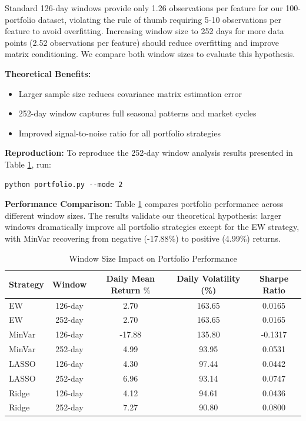 \documentclass[12pt]{article}
\begin{document}
Standard 126-day windows provide only 1.26 observations per feature for our 100-portfolio dataset, violating the rule of thumb requiring 5-10 observations per feature to avoid overfitting. Increasing window size to 252 days for more data points (2.52 observations per feature) should reduce overfitting and improve matrix conditioning. We compare both window sizes to evaluate this hypothesis.

\textbf{Theoretical Benefits:}
\begin{itemize}
    \item Larger sample size reduces covariance matrix estimation error
    \item 252-day window captures full seasonal patterns and market cycles
    \item Improved signal-to-noise ratio for all portfolio strategies
\end{itemize}

\textbf{Reproduction:}
To reproduce the 252-day window analysis results presented in Table \ref{tab:window_comparison}, run:
\begin{lstlisting}
python portfolio.py --mode 2
\end{lstlisting}

\textbf{Performance Comparison:}
Table \ref{tab:window_comparison} compares portfolio performance across different window sizes. The results validate our theoretical hypothesis: larger windows dramatically improve all portfolio strategies except for the EW strategy, with MinVar recovering from negative (-17.88\%) to positive (4.99\%) returns.

\begin{table}[h]
\centering
\caption{Window Size Impact on Portfolio Performance}
\label{tab:window_comparison}
\begin{tabular}{lcccc}
\hline
Strategy & Window & Daily Mean Return \(\%\) & Daily Volatility (\%) & Sharpe Ratio \\
\hline
EW & 126-day & 2.70 & 163.65 & 0.0165 \\
EW & 252-day & 2.70 & 163.65 & 0.0165 \\
MinVar & 126-day & -17.88 & 135.80 & -0.1317 \\
MinVar & 252-day & 4.99 & 93.95 & 0.0531 \\
LASSO & 126-day & 4.30 & 97.44 & 0.0442 \\
LASSO & 252-day & 6.96 & 93.14 & 0.0747 \\
Ridge & 126-day & 4.12 & 94.61 & 0.0436 \\
Ridge & 252-day & 7.27 & 90.80 & 0.0800 \\
\hline
\end{tabular}
\end{table}
\end{document}
